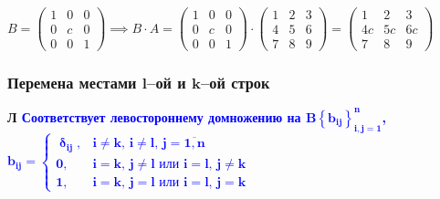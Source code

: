 \documentclass[12pt, a4paper]{report}
\newcommand{\sqbox}{%
	\collectbox{%
		\setlength{\fboxsep}{2pt}%
		\fbox{\BOXCONTENT}%
	}%
}
\newcommand{\lm}[1][]{\begin{flushleft}\textbf{\sqbox{Л} \textcolor{Blue}{#1}}\end{flushleft}}
\begin{document}
	\bigskip\(B=\begin{pmatrix}1&0&0\\0&c&0\\0&0&1\end{pmatrix}\implies B\cdot A = \begin{pmatrix}1&0&0\\0&c&0\\0&0&1\end{pmatrix}\cdot \begin{pmatrix}1&2&3\\4&5&6\\7&8&9\end{pmatrix}=\begin{pmatrix}1&2&3\\4c&5c&6c\\7&8&9\end{pmatrix}\)
	\subsubsection{Перемена местами \(\boldsymbol{l}\)--ой и \(\boldsymbol{k}\)--ой строк}
	\lm[Соответствует левостороннему домножению на \(\boldsymbol{B\left\{b_{ij}\right\}_{i,j=1}^{n}}\), \(\boldsymbol{b_{ij}=\begin{cases}\updelta_{ij},&i\neq k,\,i\neq l,\,j=\overline{1,n}\\0,&i=k,\,j\neq l\text{ или }i=l,\,j\neq k\\1,&i=k,\,j=l\text{ или }i=l,\,j=k\end{cases}}\)]
	
\end{document}
